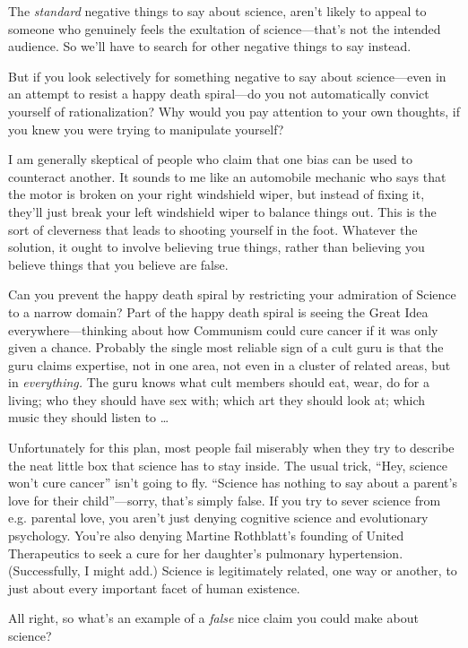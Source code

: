 {
 The \textit{standard} negative things to say about science,
aren't likely to appeal to someone who genuinely feels
the exultation of science---that's not the intended
audience. So we'll have to search for other negative
things to say instead.}

{
 But if you look selectively for something negative to say about
science---even in an attempt to resist a happy death spiral---do you
not automatically convict yourself of rationalization? Why would you
pay attention to your own thoughts, if you knew you were trying to
manipulate yourself?}

{
 I am generally skeptical of people who claim that one bias can be
used to counteract another. It sounds to me like an automobile mechanic
who says that the motor is broken on your right windshield wiper, but
instead of fixing it, they'll just break your left
windshield wiper to balance things out. This is the sort of cleverness
that leads to shooting yourself in the foot. Whatever the solution, it
ought to involve believing true things, rather than believing you
believe things that you believe are false.}

{
 Can you prevent the happy death spiral by restricting your
admiration of Science to a narrow domain? Part of the happy death
spiral is seeing the Great Idea everywhere---thinking about how
Communism could cure cancer if it was only given a chance. Probably the
single most reliable sign of a cult guru is that the guru claims
expertise, not in one area, not even in a cluster of related areas, but
in \textit{everything.} The guru knows what cult members should eat,
wear, do for a living; who they should have sex with; which art they
should look at; which music they should listen to \ldots}

{
 Unfortunately for this plan, most people fail miserably when they
try to describe the neat little box that science has to stay inside.
The usual trick, ``Hey, science won't
cure cancer'' isn't going to fly.
``Science has nothing to say about a
parent's love for their
child''---sorry, that's simply false.
If you try to sever science from e.g. parental love, you
aren't just denying cognitive science and evolutionary
psychology. You're also denying Martine
Rothblatt's founding of United Therapeutics to seek a
cure for her daughter's pulmonary hypertension.
(Successfully, I might add.) Science is legitimately related, one way
or another, to just about every important facet of human existence.}

{
 All right, so what's an example of a
\textit{false} nice claim you could make about science?}

